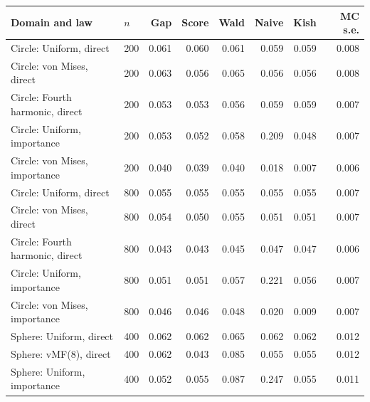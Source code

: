 \begin{tabular}{llrrrrrr}
\toprule
Domain and law & $n$ & Gap & Score & Wald & Naive & Kish & MC s.e.\\
\midrule
Circle: Uniform, direct & 200 & 0.061 & 0.060 & 0.061 & 0.059 & 0.059 & 0.008\\
Circle: von Mises, direct & 200 & 0.063 & 0.056 & 0.065 & 0.056 & 0.056 & 0.008\\
Circle: Fourth harmonic, direct & 200 & 0.053 & 0.053 & 0.056 & 0.059 & 0.059 & 0.007\\
Circle: Uniform, importance & 200 & 0.053 & 0.052 & 0.058 & 0.209 & 0.048 & 0.007\\
Circle: von Mises, importance & 200 & 0.040 & 0.039 & 0.040 & 0.018 & 0.007 & 0.006\\
Circle: Uniform, direct & 800 & 0.055 & 0.055 & 0.055 & 0.055 & 0.055 & 0.007\\
Circle: von Mises, direct & 800 & 0.054 & 0.050 & 0.055 & 0.051 & 0.051 & 0.007\\
Circle: Fourth harmonic, direct & 800 & 0.043 & 0.043 & 0.045 & 0.047 & 0.047 & 0.006\\
Circle: Uniform, importance & 800 & 0.051 & 0.051 & 0.057 & 0.221 & 0.056 & 0.007\\
Circle: von Mises, importance & 800 & 0.046 & 0.046 & 0.048 & 0.020 & 0.009 & 0.007\\
Sphere: Uniform, direct & 400 & 0.062 & 0.062 & 0.065 & 0.062 & 0.062 & 0.012\\
Sphere: vMF(8), direct & 400 & 0.062 & 0.043 & 0.085 & 0.055 & 0.055 & 0.012\\
Sphere: Uniform, importance & 400 & 0.052 & 0.055 & 0.087 & 0.247 & 0.055 & 0.011\\
\bottomrule
\end{tabular}
